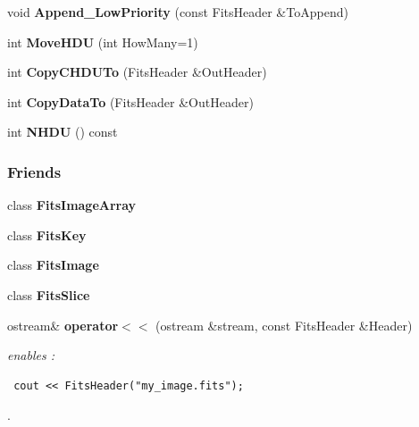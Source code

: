 \begin{CompactItemize}
\item 
{}
void {\bf Append\_\-Low\-Priority} (const Fits\-Header \&To\-Append)\label{class_fitsheader_a47}

\item 
{}
int {\bf Move\-HDU} (int How\-Many=1)\label{class_fitsheader_a48}

\item 
{}
int {\bf Copy\-CHDUTo} (Fits\-Header \&Out\-Header)\label{class_fitsheader_a49}

\item 
{}
int {\bf Copy\-Data\-To} (Fits\-Header \&Out\-Header)\label{class_fitsheader_a50}

\item 
{}
int {\bf NHDU} () const\label{class_fitsheader_a51}

\end{CompactItemize}
\subsubsection*{Friends}
\begin{CompactItemize}
\item 
class {\bf Fits\-Image\-Array}
\item 
class {\bf Fits\-Key}
\item 
class {\bf Fits\-Image}
\item 
class {\bf Fits\-Slice}
\item 
{}
ostream\& {\bf operator$<$$<$} (ostream \&stream, const Fits\-Header \&Header)\label{class_fitsheader_l4}

\begin{CompactList}\small\item\em enables : \footnotesize\begin{verbatim} cout << FitsHeader("my_image.fits"); \end{verbatim}\normalsize 
.\item\end{CompactList}\end{CompactItemize}


